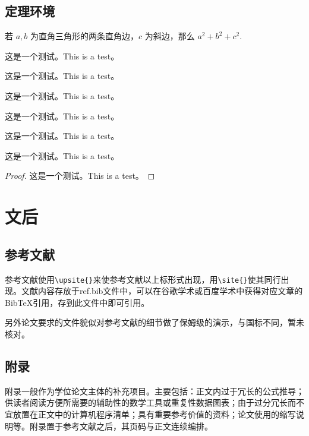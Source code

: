 \documentclass{bucthesis}
\begin{document}
\subsection{定理环境}{\par
	\begin{theorem}[勾股定理]
		若 $a,b$ 为直角三角形的两条直角边，$c$ 为斜边，那么 $a^2 + b^2 + c^2.$
	\end{theorem}
	\begin{definition}
		这是一个测试。This is a test。
	\end{definition}
	\begin{lemma}
		这是一个测试。This is a test。
	\end{lemma}
	\begin{inference}
		这是一个测试。This is a test。
	\end{inference}
	\begin{proposition}
		这是一个测试。This is a test。
	\end{proposition}
	\begin{example}
		这是一个测试。This is a test。
	\end{example}
	\begin{remark}
		这是一个测试。This is a test。
	\end{remark}
	\begin{proof}
		这是一个测试。This is a test。
	\end{proof}}


\section{文后}
\subsection{参考文献}{\par
	参考文献使用\verb|\upsite{}|来使参考文献以上标形式出现，用\verb|\site{}|使其同行出现。文献内容存放于ref.bib文件中，可以在谷歌学术或百度学术中获得对应文章的BibTeX引用，存到此文件中即可引用。\par
	另外论文要求的文件貌似对参考文献的细节做了保姆级的演示，与国标不同，暂未核对。}
\subsection{附录}{\par
	附录一般作为学位论文主体的补充项目。主要包括：正文内过于冗长的公式推导；供读者阅读方便所需要的辅助性的数学工具或重复性数据图表；由于过分冗长而不宜放置在正文中的计算机程序清单；具有重要参考价值的资料；论文使用的缩写说明等。附录置于参考文献之后，其页码与正文连续编排。}
\end{document}
